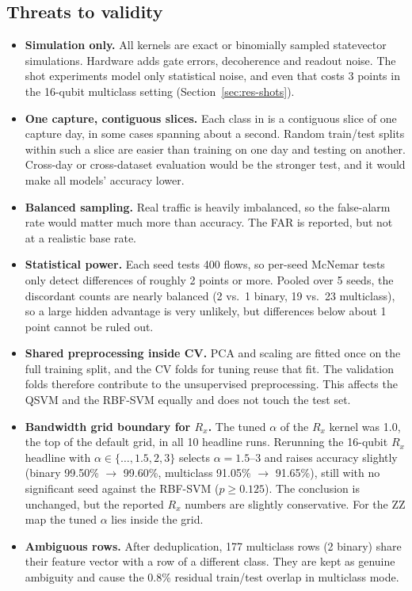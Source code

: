 \subsection{Threats to validity}
\begin{itemize}
\item \textbf{Simulation only.} All kernels are exact or binomially sampled statevector
      simulations. Hardware adds gate errors, decoherence and readout noise. The shot
      experiments model only statistical noise, and even that costs 3 points in the 16-qubit
      multiclass setting (Section~\ref{sec:res-shots}).
\item \textbf{One capture, contiguous slices.} Each class in  is a contiguous slice of
      one capture day, in some cases spanning about a second. Random train/test splits within such
      a slice are easier than training on one day and testing on another. Cross-day or cross-dataset
      evaluation would be the stronger test, and it would make all models' accuracy lower.
\item \textbf{Balanced sampling.} Real traffic is heavily imbalanced, so the false-alarm rate would
      matter much more than accuracy. The FAR is reported, but not at a realistic base rate.
\item \textbf{Statistical power.} Each seed tests 400 flows, so per-seed McNemar tests only detect
      differences of roughly 2 points or more. Pooled over 5 seeds, the discordant counts are nearly
      balanced (2 vs.\ 1 binary, 19 vs.\ 23 multiclass), so a large hidden advantage is very
      unlikely, but differences below about 1 point cannot be ruled out.
\item \textbf{Shared preprocessing inside CV.} PCA and scaling are fitted once on the full
      training split, and the CV folds for tuning reuse that fit. The validation folds therefore
      contribute to the unsupervised preprocessing. This affects the QSVM and the RBF-SVM equally
      and does not touch the test set.
\item \textbf{Bandwidth grid boundary for $R_x$.} The tuned $\alpha$ of the $R_x$ kernel was 1.0, the
      top of the default grid, in all 10 headline runs. Rerunning the 16-qubit $R_x$ headline with
      $\alpha\in\{\dots,1.5,2,3\}$ selects $\alpha=1.5$--3 and raises accuracy slightly (binary
      99.50\% $\to$ 99.60\%, multiclass 91.05\% $\to$ 91.65\%), still with no significant seed
      against the RBF-SVM ($p\ge0.125$). The conclusion is unchanged, but the reported $R_x$
      numbers are slightly conservative. For the ZZ map the tuned $\alpha$ lies inside the grid.
\item \textbf{Ambiguous rows.} After deduplication, 177 multiclass rows (2 binary) share their
      feature vector with a row of a different class. They are kept as genuine ambiguity and
      cause the 0.8\% residual train/test overlap in multiclass mode.
\end{itemize}

